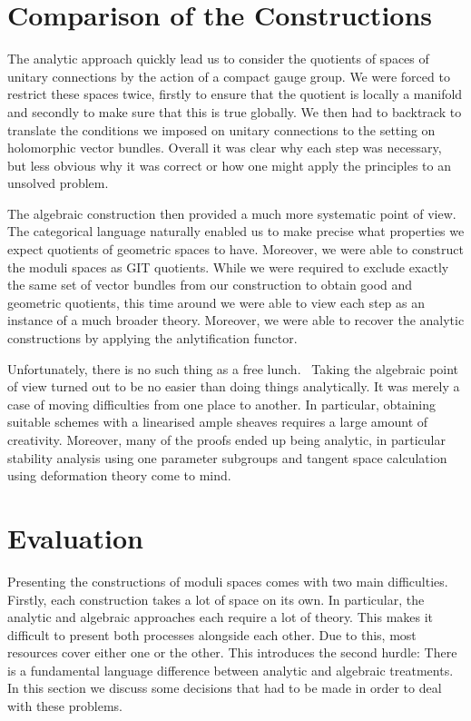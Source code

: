 \documentclass[12pt]{ociamthesis}  %
\begin{document}
\section{Comparison of the Constructions}

The analytic approach
quickly lead us to consider the quotients of spaces of unitary connections
by the action of a compact gauge group. We were forced to restrict these
spaces twice, firstly to ensure that the quotient is locally a manifold
and secondly to make sure that this is true globally. We then had to
backtrack to translate the conditions we imposed on unitary connections
to the setting on holomorphic vector bundles. Overall it was clear
why each step was necessary, but less obvious why it was correct or
how one might apply the principles to an unsolved problem.

The algebraic construction then provided a much more systematic
point of view. The categorical language naturally enabled us to make
precise what properties we expect quotients of geometric spaces to
have. Moreover, we were able to construct the moduli spaces as GIT
quotients. While we were required to exclude exactly the same set of
vector bundles from our construction to obtain good and geometric
quotients, this time around we were able to view each step as an
instance of a much broader theory. Moreover, we were able to recover
the analytic constructions by applying the anlytification functor.

Unfortunately, there is no such thing as a free lunch.~\cite{friedman1977}
Taking the algebraic point of view turned out to be no easier than
doing things analytically. It was merely a case of moving difficulties
from one place to another. In particular, obtaining suitable schemes with
a linearised ample sheaves requires a large amount of creativity.
Moreover, many of the proofs ended up being analytic, in particular
stability analysis using one parameter subgroups
and tangent space calculation using deformation theory come to mind.

\section{Evaluation}

Presenting the constructions of moduli spaces comes with two main
difficulties. Firstly, each construction takes a lot of space on its
own. In particular, the analytic and algebraic approaches each
require a lot of theory. This makes it difficult to present both
processes alongside each other. Due to this, most resources cover
either one or the other. This introduces the second hurdle: There is a
fundamental language difference between analytic and algebraic treatments.
In this section we discuss some decisions that had to be made in
order to deal with these problems.
\end{document}
